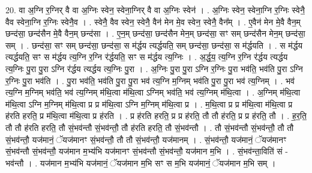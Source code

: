 \documentclass[17pt]{extarticle}
\begin{document}
20. वा अ॒ग्नि र॒ग्निर् वै वा अ॒ग्निः स्वेन॒ स्वेना॒ग्निर् वै वा अ॒ग्निः स्वेन॑ । . अ॒ग्निः स्वेन॒ स्वेना॒ग्नि र॒ग्निः स्वेनै॒ वैव स्वेना॒ग्नि र॒ग्निः स्वेनै॒व । . स्वेनै॒ वैव स्वेन॒ स्वेनै॒ वैन॑ मेन मे॒व स्वेन॒ स्वेनै॒ वैन᳚म् । . ए॒वैन॑ मेन मे॒वै वैन॒म् छन्द॑सा॒ छन्द॑सैन मे॒वै वैन॒म् छन्द॑सा । . ए॒न॒म् छन्द॑सा॒ छन्द॑सैन मेन॒म् छन्द॑सा॒ सꣳ सम् छन्द॑सैन मेन॒म् छन्द॑सा॒ सम् । . छन्द॑सा॒ सꣳ सम् छन्द॑सा॒ छन्द॑सा॒ स म॑र्द्धय त्यर्द्धयति॒ सम् छन्द॑सा॒ छन्द॑सा॒ स म॑र्द्धयति । . स म॑र्द्धय त्यर्द्धयति॒ सꣳ स म॑र्द्धय त्य॒ग्नि र॒ग्नि र॑र्द्धयति॒ सꣳ स म॑र्द्धय त्य॒ग्निः । . अ॒र्द्ध॒य॒ त्य॒ग्नि र॒ग्नि र॑र्द्धय त्यर्द्धय त्य॒ग्निः पु॒रा पु॒रा ऽग्नि र॑र्द्धय त्यर्द्धय त्य॒ग्निः पु॒रा । . अ॒ग्निः पु॒रा पु॒रा ऽग्नि र॒ग्निः पु॒रा भव॑ति॒ भव॑ति पु॒रा ऽग्नि र॒ग्निः पु॒रा भव॑ति । . पु॒रा भव॑ति॒ भव॑ति पु॒रा पु॒रा भव॑ त्य॒ग्नि म॒ग्निम् भव॑ति पु॒रा पु॒रा भव॑ त्य॒ग्निम् । . भव॑ त्य॒ग्नि म॒ग्निम् भव॑ति॒ भव॑ त्य॒ग्निम् म॑थि॒त्वा म॑थि॒त्वा ऽग्निम् भव॑ति॒ भव॑ त्य॒ग्निम् म॑थि॒त्वा । . अ॒ग्निम् म॑थि॒त्वा म॑थि॒त्वा ऽग्नि म॒ग्निम् म॑थि॒त्वा प्र प्र म॑थि॒त्वा ऽग्नि म॒ग्निम् म॑थि॒त्वा प्र । . म॒थि॒त्वा प्र प्र म॑थि॒त्वा म॑थि॒त्वा प्र ह॑रति हरति॒ प्र म॑थि॒त्वा म॑थि॒त्वा प्र ह॑रति । . प्र ह॑रति हरति॒ प्र प्र ह॑रति॒ तौ तौ ह॑रति॒ प्र प्र ह॑रति॒ तौ । . ह॒र॒ति॒ तौ तौ ह॑रति हरति॒ तौ सं॒भव॑न्तौ सं॒भव॑न्तौ॒ तौ ह॑रति हरति॒ तौ सं॒भव॑न्तौ । . तौ सं॒भव॑न्तौ सं॒भव॑न्तौ॒ तौ तौ सं॒भव॑न्तौ॒ यज॑मानं॒ ॅयज॑मानꣳ सं॒भव॑न्तौ॒ तौ तौ सं॒भव॑न्तौ॒ यज॑मानम् । . सं॒भव॑न्तौ॒ यज॑मानं॒ ॅयज॑मानꣳ सं॒भव॑न्तौ सं॒भव॑न्तौ॒ यज॑मान म॒भ्य॑भि यज॑मानꣳ सं॒भव॑न्तौ सं॒भव॑न्तौ॒ यज॑मान म॒भि । . सं॒भव॑न्ता॒विति॑ सं - भव॑न्तौ । . यज॑मान म॒भ्य॑भि यज॑मानं॒ ॅयज॑मान म॒भि सꣳ स म॒भि यज॑मानं॒ ॅयज॑मान म॒भि सम् । \newline
\end{document}
